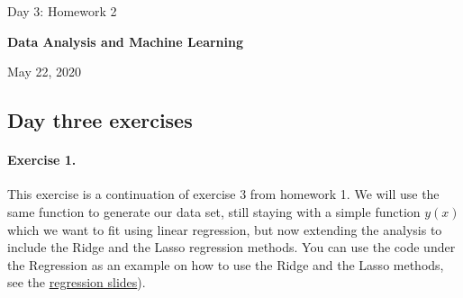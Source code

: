 \documentclass[%
oneside,                 %
final,                   %
10pt]{article}
\begin{document}

\newcommand{\exercisesection}[1]{\subsection*{#1}}






\thispagestyle{empty}

\begin{center}
{\LARGE\bf
\begin{spacing}{1.25}
Day 3: Homework 2
\end{spacing}
}
\end{center}


\begin{center}
{\bf Data Analysis and Machine Learning${}^{}$} \\ [0mm]
\end{center}

\begin{center}
\end{center}
    

\begin{center}
May 22, 2020
\end{center}

\vspace{1cm}


\subsection*{Day three exercises}


\paragraph{Exercise 1.}
This exercise is a continuation of exercise 3 from homework 1. We will
use the same function to generate our data set, still staying with a
simple function $y(x)$ which we want to fit using linear regression,
but now extending the analysis to include the Ridge and the Lasso
regression methods. You can use the code under the Regression as an example on how to use the Ridge and the Lasso methods, see the \href{{https://compphysics.github.io/MachineLearning/doc/pub/Regression/html/Regression-bs.html}}{regression slides}). 
\end{document}
